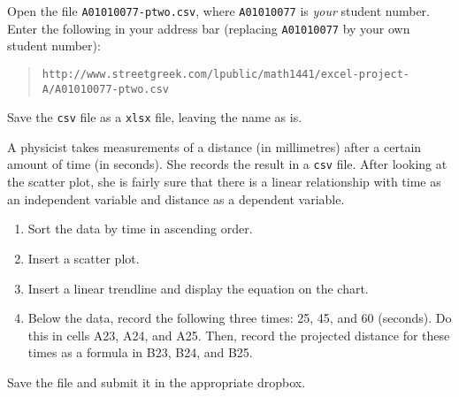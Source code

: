 \documentclass[11pt]{article}
\begin{document}
Open the file \texttt{A01010077-ptwo.csv}, where \texttt{A01010077} is
\emph{your} student number. Enter the following in your address bar
(replacing \texttt{A01010077} by your own student number):

\begin{quote}
  \texttt{http://www.streetgreek.com/lpublic/math1441/excel-project-A/A01010077-ptwo.csv}
\end{quote}

Save the \texttt{csv} file as a \texttt{xlsx} file, leaving the name
as is.

A physicist takes measurements of a distance (in millimetres) after a
certain amount of time (in seconds). She records the result in a
\texttt{csv} file. After looking at the scatter plot, she is fairly
sure that there is a linear relationship with time as an independent
variable and distance as a dependent variable.

\begin{enumerate}
\item Sort the data by time in ascending order.
\item Insert a scatter plot.
\item Insert a linear trendline and display the equation on the chart.
\item Below the data, record the following three times: 25, 45, and 60
  (seconds). Do this in cells A23, A24, and A25. Then, record
  the projected distance for these times as a formula in B23, B24, and
  B25.
\end{enumerate}

Save the file and submit it in the appropriate dropbox.
\end{document}
